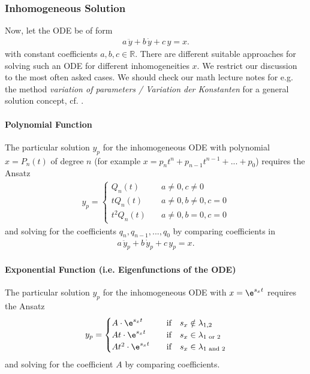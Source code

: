 \subsubsection{Inhomogeneous Solution}
Now, let the ODE be of form
\begin{align}
a \, \ddot{y} + b \, \dot{y} + c \, y = x.
\end{align}
with constant coefficients $a, b, c\in \mathbb{R}$.
%
There are different suitable approaches for solving such an ODE for
different inhomogeneities $x$.
We restrict our discussion to the most often asked cases.
We should check our math lecture notes for e.g. the method
\textit{variation of parameters / Variation der Konstanten} for a general
solution concept, cf. \cite{Burg2013}.

\paragraph{Polynomial Function}
The particular solution $y_p$ for the inhomogeneous ODE with
polynomial $x = P_n(t)$ of degree $n$
(for example $x = p_n t^n + p_{n-1} t^{n-1} + ... +p_0$)
requires the Ansatz
\begin{align}
y_p =
\begin{cases}
Q_n(t)&\quad a\neq 0, c\neq 0\\
t Q_n(t)&\quad a\neq 0, b\neq 0, c=0\\
t^2 Q_n(t)&\quad a\neq 0, b=0, c=0
\end{cases}
\end{align}
and solving for the coefficients $q_n, q_{n-1},...,q_0$ by comparing
coefficients in
\begin{align}
a \, \ddot{y}_p + b \, \dot{y}_p + c \, y_p = x.
\end{align}

\paragraph{Exponential Function (i.e. Eigenfunctions of the ODE)}
The particular solution $y_p$ for the inhomogeneous ODE with
$x = \e^{s_x t}$
requires the Ansatz
\begin{align}
y_p =
\begin{cases}
A \cdot \e^{s_x t}&\quad \text{if} \quad  s_x \notin \lambda_{1,2}\\
A t \cdot \e^{s_x t}&\quad \text{if} \quad s_x \in \lambda_{1 \text{ or } 2}\\
A t^2 \cdot \e^{s_x t}&\quad \text{if} \quad s_x \in \lambda_{1 \text{ and } 2}
\end{cases}
\end{align}
and solving for the coefficient $A$ by comparing coefficients.


